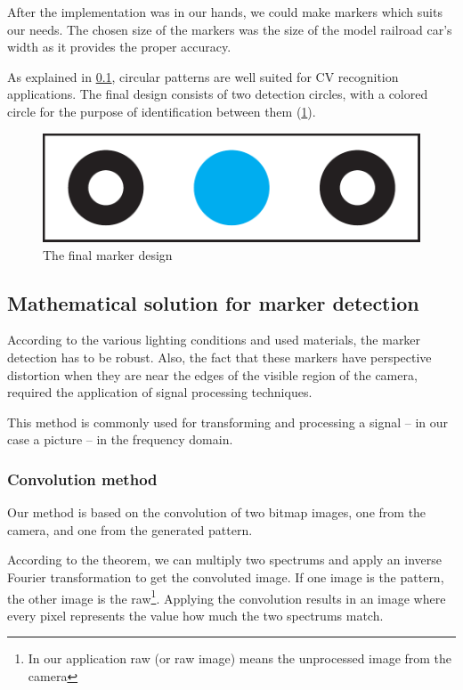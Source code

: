 After the implementation was in our hands, we could make markers which suits our needs. The chosen size of the markers was the size of the model railroad car's width as it provides the proper accuracy.

As explained in \cref{fig:case_study:opencv_math}, circular patterns are well suited for CV recognition applications. The final design consists of two detection circles, with a colored circle for the purpose of identification between them (\cref{fig:case_study:final_marker}).

\begin{figure}[h]
	\centering
	\includegraphics[width=0.5\linewidth]{include/figures/chapter_6/opencv_finalmarker}
	\caption{The final marker design}
	\label{fig:case_study:final_marker} 
\end{figure}

\subsection{Mathematical solution for marker detection}
\label{fig:case_study:opencv_math}


According to the various lighting conditions and used materials, the marker detection has to be robust. Also, the fact that these markers have perspective distortion when they are near the edges of the visible region of the camera, required the application of signal processing techniques.

This method is commonly used for transforming and processing a signal -- in our case a picture -- in the frequency domain.

\subsubsection{Convolution method}
\label{sec:case_study:convolution}

Our method is based on the convolution of two bitmap images, one from the camera, and one from the generated pattern.

According to the theorem, we can multiply two spectrums and apply an inverse Fourier transformation to get the convoluted image. If one image is the pattern, the other image is the raw\footnote{In our application raw (or raw image) means the unprocessed image from the camera}. Applying the convolution results in an image where every pixel represents the value how much the two spectrums match.

